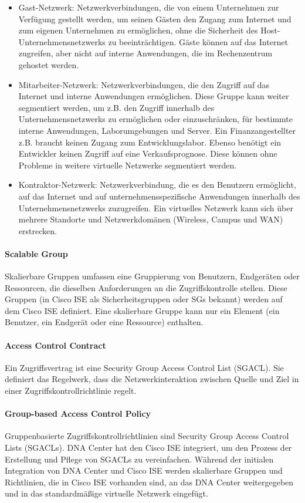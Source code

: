 \begin{itemize}
	\item Gast-Netzwerk: Netzwerkverbindungen, die von einem Unternehmen zur Verfügung gestellt werden, um seinen Gästen den Zugang zum Internet und zum eigenen Unternehmen zu ermöglichen, ohne die Sicherheit des Host-Unternehmensnetzwerks zu beeinträchtigen. Gäste können auf das Internet zugreifen, aber nicht auf interne Anwendungen, die im Rechenzentrum gehostet werden.
	\item Mitarbeiter-Netzwerk: Netzwerkverbindungen, die den Zugriff auf das Internet und interne Anwendungen ermöglichen. Diese Gruppe kann weiter segmentiert werden, um z.B. den Zugriff innerhalb des Unternehmensnetzwerks zu ermöglichen oder einzuschränken, für bestimmte interne Anwendungen, Laborumgebungen und Server. Ein Finanzangestellter z.B. braucht keinen Zugang zum Entwicklungslabor. Ebenso benötigt ein Entwickler keinen Zugriff auf eine Verkaufsprognose. Diese können ohne Probleme in weitere virtuelle Netzwerke segmentiert werden.
	\item Kontraktor-Netzwerk: Netzwerkverbindung, die es den Benutzern ermöglicht, auf das Internet und auf unternehmensspezifische Anwendungen innerhalb des Unternehmensnetzwerks zuzugreifen. Ein virtuelles Netzwerk kann sich über mehrere Standorte und Netzwerkdomänen (Wireless, Campus und WAN) erstrecken.
\end{itemize}


\paragraph{Scalable Group}
Skalierbare Gruppen umfassen eine Gruppierung von Benutzern, Endgeräten oder Ressourcen, die dieselben Anforderungen an die Zugriffskontrolle stellen. Diese Gruppen (in Cisco ISE als Sicherheitsgruppen oder SGs bekannt) werden auf dem Cisco ISE definiert. Eine skalierbare Gruppe kann nur ein Element (ein Benutzer, ein Endgerät oder eine Ressource) enthalten.

\paragraph{Access Control Contract}
Ein Zugriffsvertrag ist eine Security Group Access Control List (SGACL). Sie definiert das Regelwerk, dass die Netzwerkinteraktion zwischen Quelle und Ziel in einer Zugriffskontrollrichtlinie regelt.

\paragraph{Group-based Access Control Policy}
Gruppenbasierte Zugriffskontrollrichtlinien sind Security Group Access Control Lists (SGACLs). DNA Center hat den Cisco ISE integriert, um den Prozess der Erstellung und Pflege von SGACLs zu vereinfachen. Während der initialen Integration von DNA Center und Cisco ISE werden skalierbare Gruppen und Richtlinien, die in Cisco ISE vorhanden sind, an das DNA Center weitergegeben und in das standardmäßige virtuelle Netzwerk eingefügt.

